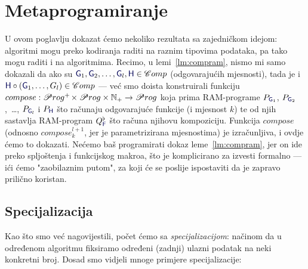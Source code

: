 \chapter{Metaprogramiranje}

U ovom poglavlju dokazat ćemo nekoliko rezultata sa zajedničkom idejom: algoritmi mogu preko kodiranja raditi na raznim tipovima podataka, pa tako mogu raditi i na algoritmima. Recimo, u lemi~\ref{lm:compram}, nismo mi samo dokazali da ako su $\f G_1,\f G_2,\dotsc,\f G_l,\f H\in\mathscr Comp$ (odgovarajućih mjesnosti), tada je i $\f H\circ(\f G_1,\dotsc,G_l)\in\mathscr Comp$ --- već smo doista konstruirali funkciju $compose:\mathscr Prog^+\mspace{-2mu}\times\mathscr Prog\times{\mathbb N}_+\to\mathscr Prog$ koja prima RAM-programe $P_{\f G_1}$, $P_{\f G_2}$,~\ldots, $P_{\f G_l}$ i $P_{\f H}$ što računaju odgovarajuće funkcije (i mjesnost $k$) te od njih sastavlja RAM-program $Q_{\f F}^\flat$ što računa njihovu kompoziciju. Funkcija $compose$ (odnosno $compose_k^{l+1}\!$, jer je parametrizirana mjesnostima) je izračunljiva, i ovdje ćemo to dokazati. Nećemo baš programirati dokaz leme~\ref{lm:compram}, jer on ide preko spljoštenja i funkcijskog makroa, što je komplicirano za izvesti formalno --- ići ćemo "zaobilaznim putom", za koji će se poslije ispostaviti da je zapravo prilično koristan.

\section{Specijalizacija}

Kao što smo već nagovijestili, počet ćemo sa \emph{specijalizacijom}: načinom da u od\-re\-đe\-nom algoritmu fiksiramo određeni (zadnji) ulazni podatak na neki konkretni broj. Dosad smo vidjeli mnoge primjere specijalizacije:

